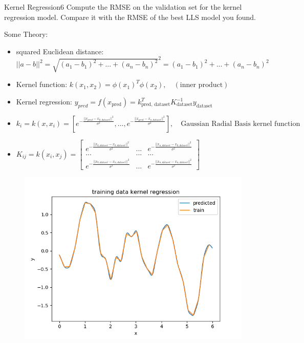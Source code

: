 \begin{questions}
\begin{question}{Kernel Regression}{6}
		Compute the RMSE on the validation set for the kernel regression model. Compare it with the RMSE of the best LLS model you found.
		
\begin{answer}
	Some Theory:
	\begin{itemize}
		\item squared Euclidean distance: $|| a - b||^2 = \sqrt{ (a_1-b_1)^2+...+(a_n-b_n)^2}^2 =  (a_1-b_1)^2+...+(a_n-b_n)^2$
		\item Kernel function: $k(x_1,x_2)=\phi(x_1)^T \phi(x_2), \quad (\text{inner product})$
		\item Kernel regression: $y_{pred} = f(x_{\text{pred}})=k^T_{\text{pred, dataset}} K^{-1}_{\text{dataset}} y_{\text{dataset}}$
		\item $k_i=k(x,x_i)=[e^{- \frac{||x_{pred}- x_{0,dataset} ||^2}{\sigma^2}}, ... ,e^{- \frac{||x_{pred}- x_{n,dataset} ||^2}{\sigma^2}}], \quad \text{Gaussian Radial Basis kernel function} $
		\item $K_{ij}=k(x_i,x_j)=\begin{bmatrix}
		e^{- \frac{||x_{0,dataset}- x_{0,dataset} ||^2}{\sigma^2}}&...&e^{- \frac{||x_{n,dataset}- x_{0,dataset} ||^2}{\sigma^2}}\\...&...&...\\e^{- \frac{||x_{0,dataset}- x_{n,dataset} ||^2}{\sigma^2}}&...&e^{- \frac{||x_{n,dataset}- x_{n,dataset} ||^2}{\sigma^2}}
		\end{bmatrix}$
	\end{itemize}
	\begin{figure}[H]
		\centering
		\begin{minipage}{.5\textwidth}
			\centering
				\includegraphics[width=1\textwidth]{img/3g.png} 

\end{minipage}
\end{figure}
\end{answer}
\end{question}
\end{questions}
